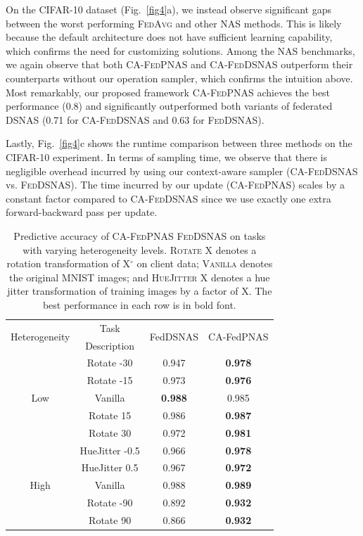 On the CIFAR-10 dataset  (Fig.~\ref{fig4}a), we instead observe significant gaps between the worst performing \textsc{FedAvg} and other NAS methods. This is likely because the default architecture does not have sufficient learning capability, which confirms the need for customizing solutions. Among the NAS benchmarks, we again observe that both \textsc{CA-FedPNAS} and \textsc{CA-FedDSNAS} outperform their counterparts without our operation sampler, which confirms the intuition above. Most remarkably, our proposed framework \textsc{CA-FedPNAS} achieves the best performance (0.8) and significantly outperformed both variants of federated \textsc{DSNAS} (0.71 for \textsc{CA-FedDSNAS} and 0.63 for \textsc{FedDSNAS}). 

Lastly, Fig.~\ref{fig4}c shows the runtime comparison between three methods on the CIFAR-10 experiment. In terms of sampling time, we observe that there is negligible overhead incurred by using our context-aware sampler (\textsc{CA-FedDSNAS} vs. \textsc{FedDSNAS}). 
The time incurred by our update (\textsc{CA-FedPNAS}) scales by a constant factor compared to \textsc{CA-FedDSNAS} since we use exactly one extra forward-backward pass per update. 

\begin{table}
	\centering
	\begin{sc}
		\begin{tabular}{|c|c|c|c|}
		\hline
		\multirow{2}{*}{Heterogeneity} & Task & \multirow{2}{*}{FedDSNAS} &  \multirow{2}{*}{CA-FedPNAS}\\
		& Description & & \\
		\hline
		\multirow{5}{*}{Low} & Rotate -30 & 0.947 & \textbf{0.978} \\
		\cline{2-4}
		& Rotate -15 & 0.973 & \textbf{0.976} \\
		\cline{2-4}
		& Vanilla & \textbf{0.988} & 0.985 \\
		\cline{2-4}
		& Rotate 15 & 0.986 & \textbf{0.987} \\
		\cline{2-4}
		& Rotate 30 & 0.972 & \textbf{0.981} \\
		\hline
		\multirow{5}{*}{High} & HueJitter -0.5 & 0.966 & \textbf{0.978} \\
		\cline{2-4}
		& HueJitter 0.5 & 0.967 & \textbf{0.972} \\
		\cline{2-4}
		& Vanilla & 0.988 & \textbf{0.989} \\
		\cline{2-4}
		& Rotate -90 & 0.892 & \textbf{0.932} \\
		\cline{2-4}
		& Rotate 90 & 0.866 & \textbf{0.932} \\
		\hline
	\end{tabular}
	\end{sc}
	\caption{Predictive accuracy of  \textsc{CA-FedPNAS} \textsc{FedDSNAS} on tasks with varying heterogeneity levels. \textsc{Rotate X}  denotes a rotation transformation of \textsc{X}$^{\circ}$ on client data; \textsc{Vanilla} denotes the original MNIST images; and \textsc{HueJitter X} denotes a hue jitter transformation of training images by a factor of \textsc{X}. The best performance in each row is in bold font.}
	\label{c4-table:1}
\end{table}

